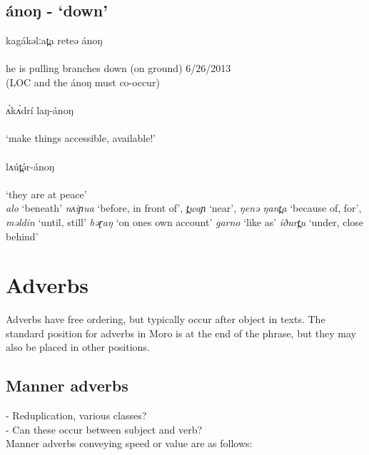 \subsection{ánoŋ	-	‘down’}
\gll kagákəlːat̪a reteə ánoŋ\\
\\
\trans	he is pulling branches down (on ground) \hfill	6/26/2013\\
(LOC and the ánoŋ must co-occur) \\
\\
\gll ʌ́kʌ́drí laŋ-ánoŋ\\
\\
\trans	‘make things accessible, available!’\\
\\
\gll lʌút̪ə́r-ánoŋ\\
\\
\trans	‘they are at peace’\\

\textit{alo} ‘beneath’ \textit{nʌiɲua} ‘before, in front of’, \textit{t̪waɲ} ‘near’, \textit{ŋenə ŋant̪a} ‘because of, for’, \textit{məldin} ‘until, still’ \textit{bəɽaŋ} ‘on ones own account’ \textit{garno} ‘like as’ \textit{iðurt̪u} ‘under, close behind’

\section{Adverbs}

Adverbs have free ordering, but typically occur after object in texts. The standard position for adverbs in Moro is at the end of the phrase, but they may also be placed in other positions. 


\subsection{Manner adverbs}

- Reduplication, various classes?\\

- Can these occur between subject and verb?\\

Manner adverbs conveying speed or value are as follows:\\

